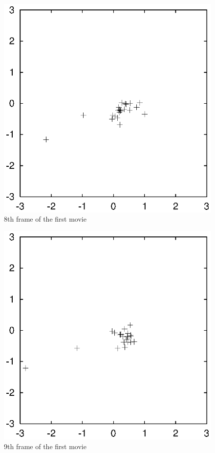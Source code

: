 \begin{figure}[htb]
\centering
\includegraphics[width=4.5in]{chap10/movietmp_nbody1.out.7.ps}
\caption[8th frame of movie \#1]
{8th frame of the first movie}
\label{fig:movie1.8}
\end{figure}

\begin{figure}[htb]
\centering
\includegraphics[width=4.5in]{chap10/movietmp_nbody1.out.8.ps}
\caption[9th frame of movie \#1]
{9th frame of the first movie}
\label{fig:movie1.9}
\end{figure}


